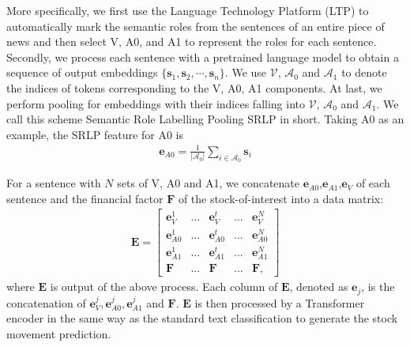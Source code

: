 \documentclass{article}
\begin{document}
More specifically, we first use the Language Technology Platform (LTP) \cite{LTP} to automatically mark the semantic roles from the sentences of an entire piece of news and then select V, A0, and A1 to represent the roles for each sentence. Secondly, we process each sentence with a pretrained language model to obtain a sequence of output embeddings
$\{\mathbf{s}_1,\mathbf{s}_2,\cdots,\mathbf{s}_n\}$. We use $\mathcal{V}$, $\mathcal{A}_0$ and $\mathcal{A}_1$ to denote the indices of tokens corresponding to the V, A0, A1 components. At last, we perform pooling for embeddings with their indices falling into $\mathcal{V}$, $\mathcal{A}_0$ and $\mathcal{A}_1$. We call this scheme Semantic Role Labelling Pooling SRLP in short. Taking A0 as an example, the SRLP feature for A0 is 
\begin{align}
\mathbf{e}_{A0} = \frac{1}{|\mathcal{A}_0|}\sum_{i\in \mathcal{A}_0 }\mathbf{s}_i
\end{align}

For a sentence with $N$ sets of V, A0 and A1, we concatenate $\mathbf{e}_{A0}$,$\mathbf{e}_{A1}$,$\mathbf{e}_{V}$ of each sentence and the financial factor $\mathbf{F}$ of the stock-of-interest into a data matrix: 
\begin{equation}
\begin{aligned}
\mathbf{E} = \begin{bmatrix}
                \mathbf{e}_V^1  & ...& \mathbf{e}_V^t& ...& \mathbf{e}_V^N\\
                \mathbf{e}_{A0}^1  & ...& \mathbf{e}_{A0}^t & ...& \mathbf{e}_{A0}^N \\
                \mathbf{e}_{A1}^1  & ...& \mathbf{e}_{A1}^t& ...& \mathbf{e}_{A1}^N \\
                \mathbf{F}  & ...& \mathbf{F} & ...& \mathbf{F},
            \end{bmatrix}
\end{aligned}
\label{eq.srl}
\end{equation}
where $\mathbf{E}$ is output of the above process. Each column of $\mathbf{E}$, denoted as $\mathbf{e}_j$, is the concatenation of $\mathbf{e}^j_V,\mathbf{e}^j_{A0},\mathbf{e}^j_{A1}$ and $\mathbf{F}$. $\mathbf{E}$ is then processed by a Transformer encoder in the same way as the standard text classification to generate the stock movement prediction. 
\end{document}

